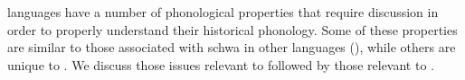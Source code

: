  languages have a number of phonological properties
that require discussion in order to properly understand their historical phonology.
Some of these properties are similar to those associated with
schwa in other  languages (),
while others are unique to .
We discuss those issues relevant to 
followed by those relevant to .